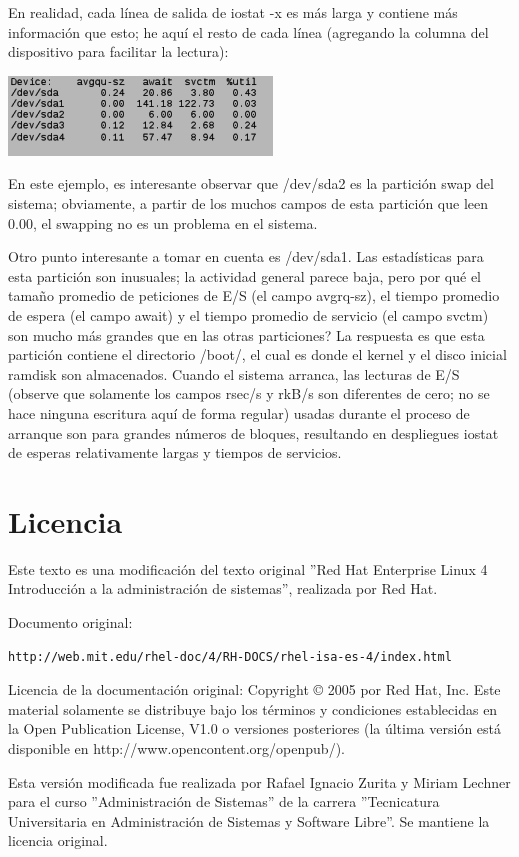 \documentclass[12pt]{article}
\begin{document}
En realidad, cada línea de salida de iostat -x es más larga y contiene más información que esto; he aquí el resto de cada línea (agregando la columna del dispositivo para facilitar la lectura):

\begin{center}
 \includegraphics{iostat3.png}
\end{center}

        
En este ejemplo, es interesante observar que /dev/sda2 es la partición swap del sistema; obviamente, a partir de los muchos campos de esta partición que leen 0.00, el swapping no es un problema en el sistema.

Otro punto interesante a tomar en cuenta es /dev/sda1. Las estadísticas para esta partición son inusuales; la actividad general parece baja, pero por qué el tamaño promedio de peticiones de E/S (el campo avgrq-sz), el tiempo promedio de espera (el campo await) y el tiempo promedio de servicio (el campo svctm) son mucho más grandes que en las otras particiones? La respuesta es que esta partición contiene el directorio /boot/, el cual es donde el kernel y el disco inicial ramdisk son almacenados. Cuando el sistema arranca, las lecturas de E/S (observe que solamente los campos rsec/s y rkB/s son diferentes de cero; no se hace ninguna escritura aquí de forma regular) usadas durante el proceso de arranque son para grandes números de bloques, resultando en despliegues iostat de esperas relativamente largas y tiempos de servicios.








\section*{Licencia}

Este texto es una modificación del texto original 
''Red Hat Enterprise Linux 4
Introducción a la administración de sistemas'', realizada por Red Hat.

Documento original: 
\begin{verbatim}
http://web.mit.edu/rhel-doc/4/RH-DOCS/rhel-isa-es-4/index.html
\end{verbatim}

Licencia de la documentación original: 
Copyright © 2005 por Red Hat, Inc. Este material solamente se distribuye bajo los términos y condiciones establecidas en la Open Publication License, V1.0 o versiones posteriores (la última versión está disponible en http://www.opencontent.org/openpub/).

	Esta versión modificada fue realizada por Rafael Ignacio Zurita y Miriam Lechner para el curso ''Administración de Sistemas'' de la carrera
''Tecnicatura Universitaria en Administración de Sistemas y Software Libre''. Se mantiene la licencia original.
\end{document}
